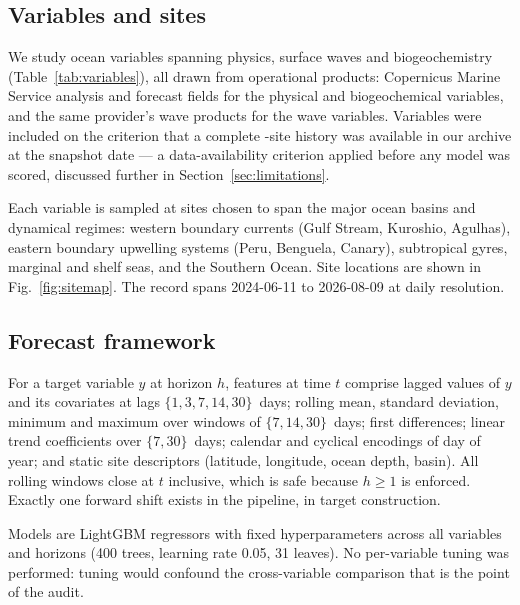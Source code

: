 \subsection{Variables and sites}

We study \NVars{} ocean variables spanning physics, surface waves and
biogeochemistry (Table~\ref{tab:variables}), all drawn from operational
products: Copernicus Marine Service analysis and forecast fields for the
physical and biogeochemical variables, and the same provider's wave products
for the wave variables. Variables were included on the criterion that a
complete \NSites{}-site history was available in our archive at the snapshot
date --- a data-availability criterion applied before any model was scored,
discussed further in Section~\ref{sec:limitations}.

Each variable is sampled at \NSites{} sites chosen to span the major ocean
basins and dynamical regimes: western boundary currents (Gulf Stream, Kuroshio,
Agulhas), eastern boundary upwelling systems (Peru, Benguela, Canary),
subtropical gyres, marginal and shelf seas, and the Southern Ocean. Site
locations are shown in Fig.~\ref{fig:sitemap}. The record spans 2024-06-11 to
2026-08-09 at daily resolution.

\begin{table}[tb]
\centering
\caption{The \NVars{} variables audited. ``Feature rows'' is the pooled count
across all \NSites{} sites after feature construction and target alignment.}
\label{tab:variables}
\tabscale

\end{table}

\subsection{Forecast framework}

For a target variable $y$ at horizon $h$, features at time $t$ comprise lagged
values of $y$ and its covariates at lags $\{1,3,7,14,30\}$~days; rolling mean,
standard deviation, minimum and maximum over windows of $\{7,14,30\}$~days;
first differences; linear trend coefficients over $\{7,30\}$~days; calendar and
cyclical encodings of day of year; and static site descriptors (latitude,
longitude, ocean depth, basin). All rolling windows close at $t$ inclusive,
which is safe because $h \geq 1$ is enforced. Exactly one forward shift exists
in the pipeline, in target construction.

Models are LightGBM regressors \citep{ke2017lightgbm} with fixed
hyperparameters across all variables and horizons (400 trees, learning rate
0.05, 31 leaves). No per-variable tuning was performed: tuning would confound
the cross-variable comparison that is the point of the audit.

